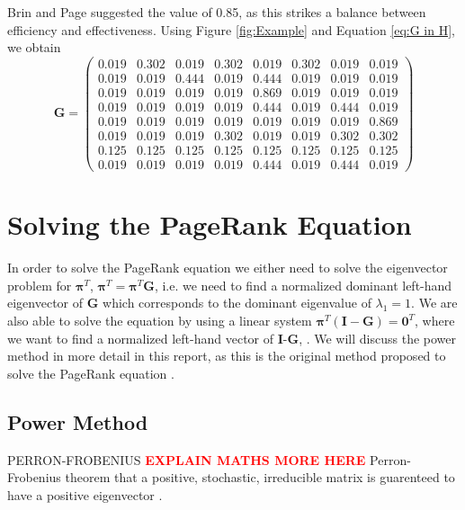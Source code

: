 \documentclass[11pt]{report}
\begin{document}
Brin and Page suggested the value of 0.85, as this strikes a balance between efficiency and effectiveness. Using Figure \ref{fig:Example} and Equation \eqref{eq:G in H}, we obtain
\begin{equation}
\textbf{G} = \left(
\begin{array}{cccccccc}
0.019 & 0.302 & 0.019 & 0.302 & 0.019 & 0.302 & 0.019 & 0.019  \\
0.019 & 0.019 & 0.444 & 0.019 & 0.444 & 0.019 & 0.019 & 0.019  \\
0.019 & 0.019 & 0.019 & 0.019 & 0.869 & 0.019 & 0.019 & 0.019  \\
0.019 & 0.019 & 0.019 & 0.019 & 0.444 & 0.019 & 0.444 & 0.019  \\
0.019 & 0.019 & 0.019 & 0.019 & 0.019 & 0.019 & 0.019 & 0.869  \\
0.019 & 0.019 & 0.019 & 0.302 & 0.019 & 0.019 & 0.302 & 0.302  \\
0.125 & 0.125 & 0.125 & 0.125 & 0.125 & 0.125 & 0.125 & 0.125  \\
0.019 & 0.019 & 0.019 & 0.019 & 0.444 & 0.019 & 0.444 & 0.019 
\end{array}
\right)
\end{equation}
\section{Solving the PageRank Equation} \label{sec:solve}
In order to solve the PageRank equation we either need to solve the eigenvector problem for $\boldsymbol{\pi}^T$, \(\boldsymbol{\pi}^T = \boldsymbol{\pi}^T\textbf{G}\), i.e. we need to find a normalized dominant left-hand eigenvector of \textbf{G} which corresponds to the dominant eigenvalue of $\lambda_1 = 1$. We are also able to solve the equation by using a linear system \(\boldsymbol{\pi}^T(\textbf{I}-\textbf{G})=\textbf{0}^T\), where we want to find a normalized left-hand vector of \textbf{I}-\textbf{G}, \cite{langville}. We will discuss the power method in more detail in this report, as this is the original method proposed to solve the PageRank equation \cite{langville}.

\subsection{Power Method} \label{sec:power}
PERRON-FROBENIUS \cite{meyer2000matrix}  \cite{gallager1992discrete} 
\textcolor{red}{\textbf{EXPLAIN MATHS MORE HERE}} Perron-Frobenius theorem that a positive, stochastic, irreducible matrix is guarenteed to have a positive eigenvector \cite{thorson2004modeling}.
\end{document}
